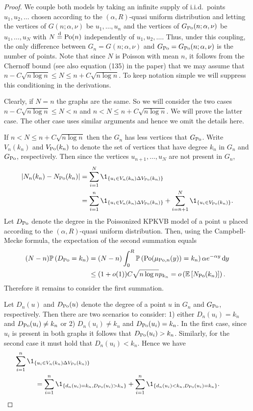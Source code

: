 \begin{proof}
We couple both models by taking an infinite supply of i.i.d.~points $u_1, u_2, \dots$ chosen according
to the $(\alpha,R)$-quasi uniform distribution and letting the vertices of $G(n;\alpha,\nu)$ be $u_1,\dots, u_n$ and
the vertices of $G_{{\mathrm{Po}}}(n;\alpha,\nu)$ be $u_1,\dots, u_N$ with $N\stackrel{\text{d}}{=} {\mathrm{Po}}(n)$ independently of
$u_1, u_2, \dots$. Thus, under this coupling, the only difference between $G_n = G(n;\alpha,\nu)$ and $G_{{\mathrm{Po}}} = G_{{\mathrm{Po}}}(n;\alpha,\nu)$ is the number of points. Note that since $N$ is Poisson with mean $n$, it follows from the Chernoff bound (see also equation (135) in the paper) that we may assume that $n - C\sqrt{n \log n} \le N \le n + C \sqrt{n \log n}$. To keep notation simple we will suppress this conditioning in the derivations.

Clearly, if $N = n$ the graphs are the same. So we will consider the two cases $n - C\sqrt{n \log n} \le N < n$ and $n < N \le n + C \sqrt{n \log n}$. We will prove the latter case. The other case uses similar arguments and hence we omit the details here.

If $n < N \le n + C \sqrt{n \log n}$ then the $G_n$ has less vertices that $G_{{\mathrm{Po}}}$. Write $V_n(k_n)$ and $V_{{\mathrm{Po}}}(k_n)$ to denote the set of vertices that have degree $k_n$ in $G_n$ and $G_{{\mathrm{Po}}}$, respectively. Then since the vertices $u_{n+1}, \dots, u_N$ are not present in $G_n$,
\begin{align*}
	\left|N_n(k_n) - N_{\Po}(k_n)\right| &= \sum_{i = 1}^N \1_{\left\{u_i \in V_n(k_n) \Delta V_{\Po}(k_n)\right\}}\\
	&= \sum_{i = 1}^n \1_{\left\{u_i \in V_n(k_n) \Delta V_{\Po}(k_n)\right\}}
		+ \sum_{i = n+1}^N \1_{\left\{u_i \in V_{\Po}(k_n)\right\}}.
\end{align*}
Let $D_{{\mathrm{Po}}}$ denote the degree in the Poissonized KPKVB model of a point $u$ placed according to the $(\alpha,R)$-quasi uniform distribution. Then, using the Campbell-Mecke formula, the expectation of the second summation equals
\begin{align*}
	(N-n) \mathbb{P}\left(D_{{\mathrm{Po}}} = k_n\right) &= (N-n) \int_0^R \mathbb{P}\left({\mathrm{Po}}(\mu_{{\mathrm{Po}},n}(y)) = k_n\right) \alpha e^{-\alpha y} \operatorname{\mathrm{d}\hspace{-2pt}} y\\
	&\le (1+o(1)) C \sqrt{n \log n} p_{k_n} = o\left(\mathbb{E}\left[N_{{\mathrm{Po}}}(k_n)\right]\right).
\end{align*}
Therefore it remains to consider the first summation.

Let $D_n(u)$ and $D_{{\mathrm{Po}}}(u)$ denote the degree of a point $u$ in $G_n$ and $G_{{\mathrm{Po}}}$, respectively. Then there are two scenarios to consider: 1) either $D_n(u_i) = k_n$ and $D_{{\mathrm{Po}}}(u_i) \ne k_n$ or 2) $D_n(u_i) \ne k_n$ and $D_{{\mathrm{Po}}}(u_i) = k_n$. In the first case, since $u_i$ is present in both graphs it follows that $D_{{\mathrm{Po}}}(u_i) > k_n$. Similarly, for the second case it must hold that $D_n(u_i) < k_n$. Hence we have
\begin{align*}
	&\hspace{-30pt}\sum_{i = 1}^n \1_{\left\{u_i \in V_n(k_n) \Delta V_{\Po}(k_n)\right\}}\\
	&= \sum_{i = 1}^n \1_{\left\{d_n(u_i) = k_n, D_{\Po}(u_i) > k_n\right\}}
		+ \sum_{i = 1}^n \1_{\left\{d_n(u_i) < k_n, D_{\Po}(u_i) = k_n\right\}}.
\end{align*}


\end{proof}

